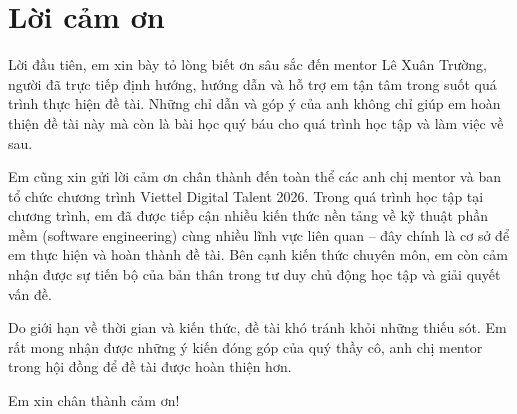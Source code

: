 \section*{Lời cảm ơn}

Lời đầu tiên, em xin bày tỏ lòng biết ơn sâu sắc đến mentor Lê Xuân Trường, người đã trực tiếp định hướng, hướng dẫn và hỗ trợ em tận tâm trong suốt quá trình thực hiện đề tài. Những chỉ dẫn và góp ý của anh không chỉ giúp em hoàn thiện đề tài này mà còn là bài học quý báu cho quá trình học tập và làm việc về sau.

Em cũng xin gửi lời cảm ơn chân thành đến toàn thể các anh chị mentor và ban tổ chức chương trình Viettel Digital Talent 2026. Trong quá trình học tập tại chương trình, em đã được tiếp cận nhiều kiến thức nền tảng về kỹ thuật phần mềm (software engineering) cùng nhiều lĩnh vực liên quan -- đây chính là cơ sở để em thực hiện và hoàn thành đề tài. Bên cạnh kiến thức chuyên môn, em còn cảm nhận được sự tiến bộ của bản thân trong tư duy chủ động học tập và giải quyết vấn đề.

Do giới hạn về thời gian và kiến thức, đề tài khó tránh khỏi những thiếu sót. Em rất mong nhận được những ý kiến đóng góp của quý thầy cô, anh chị mentor trong hội đồng để đề tài được hoàn thiện hơn.

Em xin chân thành cảm ơn!
